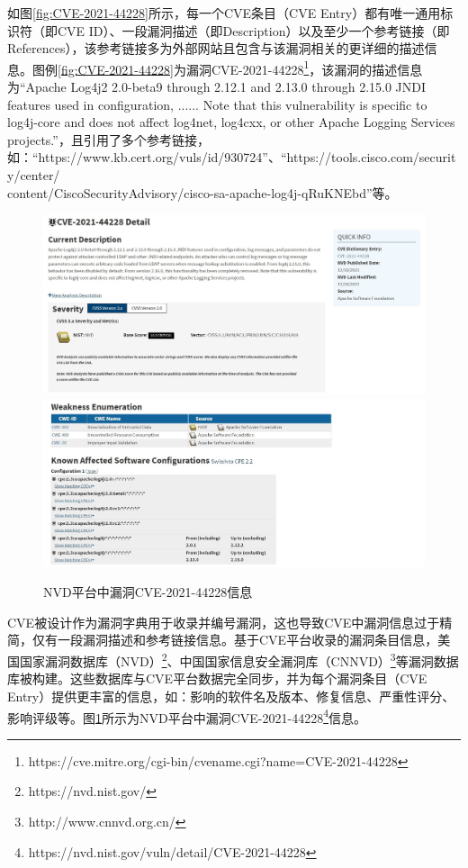如图\ref{fig:CVE-2021-44228}所示，每一个CVE条目（CVE Entry）都有唯一通用标识符（即CVE ID）、一段漏洞描述（即Description）以及至少一个参考链接（即References），该参考链接多为外部网站且包含与该漏洞相关的更详细的描述信息。图例\ref{fig:CVE-2021-44228}为漏洞CVE-2021-44228\footnote{https://cve.mitre.org/cgi-bin/cvename.cgi?name=CVE-2021-44228}，该漏洞的描述信息为“Apache Log4j2 2.0-beta9 through 2.12.1 and 2.13.0 through 2.15.0 JNDI features used in configuration, ...... Note that this vulnerability is specific to log4j-core and does not affect log4net, log4cxx, or other Apache Logging Services projects.”，且引用了多个参考链接，如：“https://www.kb.cert.org/vuls/id/930724”、“https://tools.cisco.com/security/center/\\content/CiscoSecurityAdvisory/cisco-sa-apache-log4j-qRuKNEbd”等。
\begin{figure}[h]
    \centering
    \includegraphics[width=1.0\textwidth]{fig/NVD-2021-44228}
    \includegraphics[width=1.0\textwidth]{fig/NVD-2021-44228-2}
    \caption{NVD平台中漏洞CVE-2021-44228信息}
    \label{fig:NVD-2021-44228}
\end{figure}


CVE被设计作为漏洞字典用于收录并编号漏洞，这也导致CVE中漏洞信息过于精简，仅有一段漏洞描述和参考链接信息。基于CVE平台收录的漏洞条目信息，美国国家漏洞数据库（NVD）\footnote{https://nvd.nist.gov/}、中国国家信息安全漏洞库（CNNVD）\footnote{http://www.cnnvd.org.cn/}等漏洞数据库被构建。这些数据库与CVE平台数据完全同步，并为每个漏洞条目（CVE Entry）提供更丰富的信息，如：影响的软件名及版本、修复信息、严重性评分、影响评级等。图\ref{fig:NVD-2021-44228}所示为NVD平台中漏洞CVE-2021-44228\footnote{https://nvd.nist.gov/vuln/detail/CVE-2021-44228}信息。




